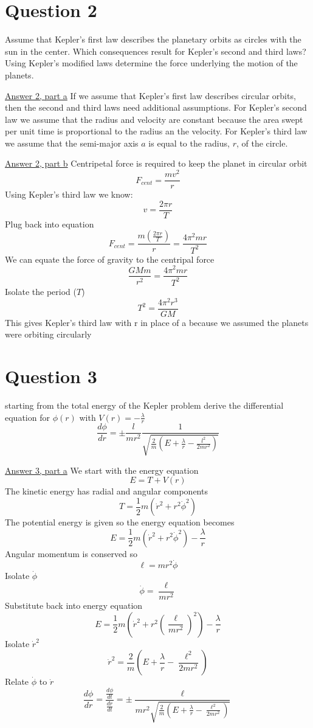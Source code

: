 \documentclass[12pt]{article}
\begin{document}
\section{Question 2}
    Assume that Kepler's first law describes the planetary orbits as circles with the sun in the center. Which consequences result for Kepler's second and third laws? Using Kepler's modified laws determine the force underlying the motion of the planets.

    \underline{Answer 2, part a}
    If we assume that Kepler's first law describes circular orbits, then the second and third laws need additional assumptions. For Kepler's second law we assume that the radius and velocity are constant because the area swept per unit time is proportional to the radius an the velocity. For Kepler's third law we assume that the semi-major axis $a$ is equal to the radius, $r$, of the circle. 

    \underline{Answer 2, part b}
    Centripetal force is required to keep the planet in circular orbit
    \[
        F_{cent} = \frac{m v^2}{r}
    \]
    Using Kepler's third law we know:
    \[
        v = \frac{2 \pi r}{T}
    \]
    Plug back into equation
    \[
        F_{cent} = \frac{m \left(\frac{2 \pi r}{T} \right)}{r} = \frac{4 \pi^2 m r}{T^2}
    \]
    We can equate the force of gravity to the centripal force
    \[
        \frac{G M m}{r^2} = \frac{4 \pi^2 m r}{T^2}
    \]
    Isolate the period ($T$)
    \[
        T^2 = \frac{4 \pi^2 r^3}{G M}
    \]
    This gives Kepler's third law with r in place of a because we assumed the planets were orbiting circularly

\section{Question 3}
    starting from the total energy of the Kepler problem derive the differential equation for $\phi(r)$ with $V(r) = - \frac{\lambda}{r}$
    \[
        \frac{d\phi}{dr} = \pm \frac{l}{m r^2} \frac{1}{\sqrt{\frac{2}{m} \left(E + \frac{\lambda}{r} - \frac{l^2}{2 m r^2} \right)}}
    \]

    \underline{Answer 3, part a}
    We start with the energy equation
    \[
        E = T + V(r)
    \]
    The kinetic energy has radial and angular components
    \[
        T = \frac{1}{2} m \left(\dot{r}^2 + r^2 \dot{\phi}^2 \right)
    \]
    The potential energy is given so the energy equation becomes
    \[
        E = \frac{1}{2} m \left(\dot{r}^2 + r^2 \dot{\phi}^2 \right) - \frac{\lambda}{r}
    \]
    Angular momentum is conserved so
    \[
        \ell = m r^2 \dot{\phi}
    \]
    Isolate $\dot{\phi}$
    \[
        \dot{\phi} = \frac{\ell}{m r^2}
    \]
    Substitute back into energy equation
    \[
        E = \frac{1}{2} m \left(\dot{r}^2 + r^2 \left(\frac{\ell}{m r^2} \right)^2 \right) - \frac{\lambda}{r}
    \]
    Isolate $\dot{r}^2$
    \[
        \dot{r}^2 = \frac{2}{m} \left(E + \frac{\lambda}{r} - \frac{\ell^2}{2 m r^2} \right)
    \]
    Relate $\dot{\phi}$ to $\dot{r}$
    \[
        \frac{d\phi}{d r} = \frac{\frac{d\phi}{dt}}{\frac{d r}{dt}} = \pm \frac{\ell}{m r^2 \sqrt{\frac{2}{m} \left(E + \frac{\lambda}{r} - \frac{\ell^2}{2 m r^2} \right)}}
    \]
\end{document}
